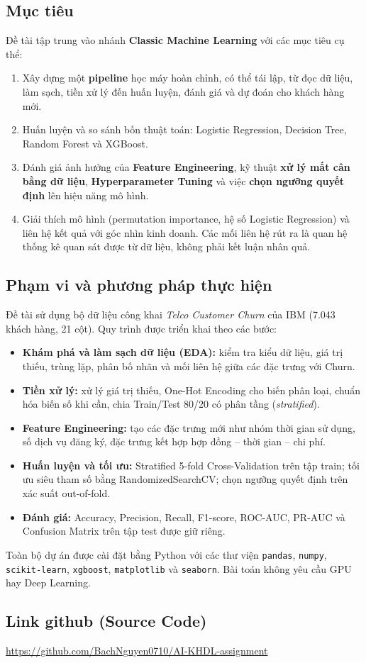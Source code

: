 \subsection{Mục tiêu}
Đề tài tập trung vào nhánh \textbf{Classic Machine Learning} với các mục tiêu cụ thể:
\begin{enumerate}
    \item Xây dựng một \textbf{pipeline} học máy hoàn chỉnh, có thể tái lập, từ đọc dữ liệu, làm sạch, tiền xử lý đến huấn luyện, đánh giá và dự đoán cho khách hàng mới.
    \item Huấn luyện và so sánh bốn thuật toán: Logistic Regression, Decision Tree, Random Forest và XGBoost.
    \item Đánh giá ảnh hưởng của \textbf{Feature Engineering}, kỹ thuật \textbf{xử lý mất cân bằng dữ liệu}, \textbf{Hyperparameter Tuning} và việc \textbf{chọn ngưỡng quyết định} lên hiệu năng mô hình.
    \item Giải thích mô hình (permutation importance, hệ số Logistic Regression) và liên hệ kết quả với góc nhìn kinh doanh. Các mối liên hệ rút ra là quan hệ thống kê quan sát được từ dữ liệu, không phải kết luận nhân quả.
\end{enumerate}

\subsection{Phạm vi và phương pháp thực hiện}
Đề tài sử dụng bộ dữ liệu công khai \textit{Telco Customer Churn} của IBM (7.043 khách hàng, 21 cột). Quy trình được triển khai theo các bước:
\begin{itemize}
    \item \textbf{Khám phá và làm sạch dữ liệu (EDA):} kiểm tra kiểu dữ liệu, giá trị thiếu, trùng lặp, phân bố nhãn và mối liên hệ giữa các đặc trưng với Churn.
    \item \textbf{Tiền xử lý:} xử lý giá trị thiếu, One-Hot Encoding cho biến phân loại, chuẩn hóa biến số khi cần, chia Train/Test 80/20 có phân tầng (\textit{stratified}).
    \item \textbf{Feature Engineering:} tạo các đặc trưng mới như nhóm thời gian sử dụng, số dịch vụ đăng ký, đặc trưng kết hợp hợp đồng -- thời gian -- chi phí.
    \item \textbf{Huấn luyện và tối ưu:} Stratified 5-fold Cross-Validation trên tập train; tối ưu siêu tham số bằng RandomizedSearchCV; chọn ngưỡng quyết định trên xác suất out-of-fold.
    \item \textbf{Đánh giá:} Accuracy, Precision, Recall, F1-score, ROC-AUC, PR-AUC và Confusion Matrix trên tập test được giữ riêng.
\end{itemize}

Toàn bộ dự án được cài đặt bằng Python với các thư viện \texttt{pandas}, \texttt{numpy}, \texttt{scikit-learn}, \texttt{xgboost}, \texttt{matplotlib} và \texttt{seaborn}. Bài toán không yêu cầu GPU hay Deep Learning.

\subsection{Link github (Source Code)}
\url{https://github.com/BachNguyen0710/AI-KHDL-assignment}

